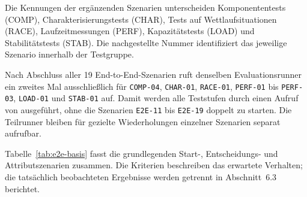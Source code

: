 Die Kennungen der ergänzenden Szenarien unterscheiden Komponententests (COMP),
Charakterisierungstests (CHAR), Tests auf Wettlaufsituationen (RACE), Laufzeitmessungen (PERF),
Kapazitätstests (LOAD) und Stabilitätstests (STAB). Die nachgestellte Nummer identifiziert das
jeweilige Szenario innerhalb der Testgruppe.

Nach Abschluss aller 19 End-to-End-Szenarien ruft  denselben Evaluationsrunner ein
zweites Mal ausschließlich für \texttt{COMP-04}, \texttt{CHAR-01}, \texttt{RACE-01},
\texttt{PERF-01} bis \texttt{PERF-03}, \texttt{LOAD-01} und \texttt{STAB-01} auf. Damit werden
alle Teststufen durch einen Aufruf von  ausgeführt, ohne die Szenarien
\texttt{E2E-11} bis \texttt{E2E-19} doppelt zu starten. Die Teilrunner bleiben für gezielte
Wiederholungen einzelner Szenarien separat aufrufbar.

Tabelle~\ref{tab:e2e-basis} fasst die grundlegenden Start-, Entscheidungs- und Attributszenarien
zusammen. Die Kriterien beschreiben das erwartete Verhalten; die tatsächlich beobachteten
Ergebnisse werden getrennt in Abschnitt~6.3 berichtet.

